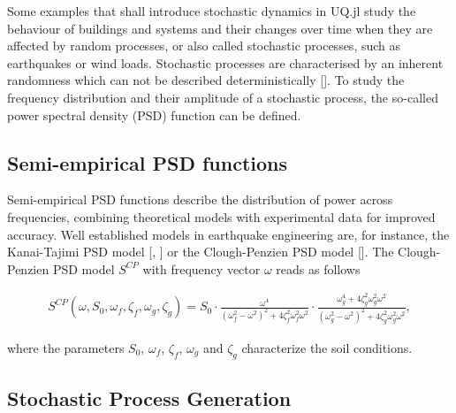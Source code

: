 Some examples that shall introduce stochastic dynamics in UQ.jl study the behaviour of buildings and systems and their changes over time when they are affected by random processes, or also called stochastic processes, such as earthquakes or wind loads. Stochastic processes are characterised by an inherent randomness which can not be described deterministically []. To study the frequency distribution and their amplitude of a stochastic process, the so-called power spectral density (PSD) function can be defined.



\subsection{Semi-empirical PSD functions}



\label{5291485014187948009}{}


Semi-empirical PSD functions describe the distribution of power across frequencies, combining theoretical models with experimental data for improved accuracy. Well established models in earthquake engineering are, for instance, the Kanai-Tajimi PSD model [, ] or the Clough-Penzien PSD model []. The Clough-Penzien PSD model \(S^{CP}\) with frequency vector \(\omega\) reads as follows



\begin{equation*}
\begin{split}    S^{CP}(\omega, S_0, \omega_{f}, \zeta_{f}, \omega_{g}, \zeta_{g}) = S_0 \cdot \frac{{\omega^4}}{{(\omega_{f}^2-\omega^2)^2+4  \zeta_{f}^2  \omega_{f}^2  \omega^2}} \cdot \frac{{\omega_{g}^4+4  \zeta_{g}^2  \omega_{g}^2  \omega^2}}{{(\omega_{g}^2-\omega^2)^2+4  \zeta_{g}^2  \omega_{g}^2  \omega^2}},\end{split}\end{equation*}


where the parameters \(S_0\), \(\omega_{f}\), \(\zeta_{f}\), \(\omega_{g}\) and \(\zeta_{g}\) characterize the soil conditions.



\subsection{Stochastic Process Generation}




